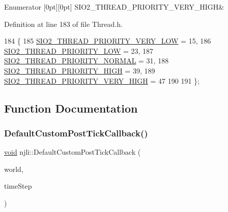 \begin{DoxyEnumFields}{Enumerator}
[0pt][0pt]{}\mbox{\label{namespacenjli_afafb6e52d47a71ae588f26e10f72e41aa8bcaf8d75832437cf6097181b6a9c177}} 
S\+I\+O2\+\_\+\+T\+H\+R\+E\+A\+D\+\_\+\+P\+R\+I\+O\+R\+I\+T\+Y\+\_\+\+V\+E\+R\+Y\+\_\+\+H\+I\+GH&\\
\hline

\end{DoxyEnumFields}


Definition at line 183 of file Thread.\+h.


\begin{DoxyCode}
184   \{
185     \mbox{\hyperlink{namespacenjli_afafb6e52d47a71ae588f26e10f72e41aa835a0386724239439dda616d1787e87e}{SIO2\_THREAD\_PRIORITY\_VERY\_LOW}} = 15,
186     \mbox{\hyperlink{namespacenjli_afafb6e52d47a71ae588f26e10f72e41aa2b4e524af29ebc09a0de7eb236333196}{SIO2\_THREAD\_PRIORITY\_LOW}} = 23,
187     \mbox{\hyperlink{namespacenjli_afafb6e52d47a71ae588f26e10f72e41aaacd042e327263f640ce7c87c50e868a1}{SIO2\_THREAD\_PRIORITY\_NORMAL}} = 31,
188     \mbox{\hyperlink{namespacenjli_afafb6e52d47a71ae588f26e10f72e41aaf334987028f6fb3c99daa775393010d1}{SIO2\_THREAD\_PRIORITY\_HIGH}} = 39,
189     \mbox{\hyperlink{namespacenjli_afafb6e52d47a71ae588f26e10f72e41aa8bcaf8d75832437cf6097181b6a9c177}{SIO2\_THREAD\_PRIORITY\_VERY\_HIGH}} = 47
190 
191   \};
\end{DoxyCode}


\subsection{Function Documentation}
\mbox{\label{namespacenjli_a805528e68206342abc780b53e418030d}} 
\subsubsection{\texorpdfstring{Default\+Custom\+Post\+Tick\+Callback()}{DefaultCustomPostTickCallback()}}
{\footnotesize\ttfamily \mbox{\hyperlink{_thread_8h_af1e856da2e658414cb2456cb6f7ebc66}{void}} njli\+::\+Default\+Custom\+Post\+Tick\+Callback (\begin{DoxyParamCaption}\item[{bt\+Dynamics\+World $\ast$}]{world,  }\item[{bt\+Scalar}]{time\+Step }\end{DoxyParamCaption})}

